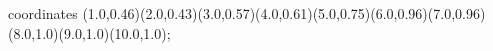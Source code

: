 					coordinates { (1.0,0.46)(2.0,0.43)(3.0,0.57)(4.0,0.61)(5.0,0.75)(6.0,0.96)(7.0,0.96)(8.0,1.0)(9.0,1.0)(10.0,1.0)};